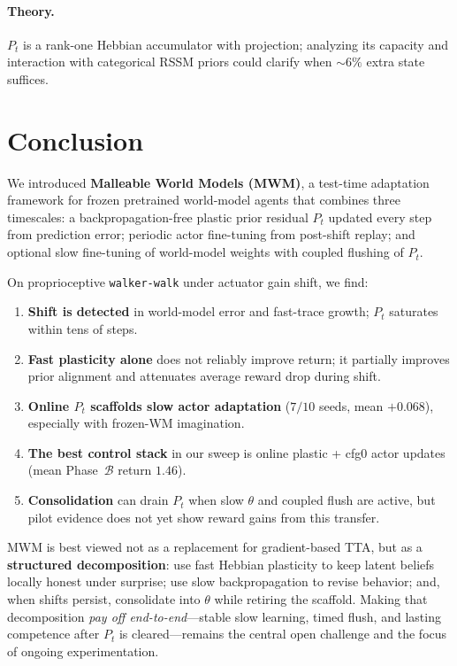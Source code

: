 \paragraph{Theory.}
$P_t$ is a rank-one Hebbian accumulator with projection; analyzing its capacity and interaction with categorical RSSM priors could clarify when ${\sim}6\%$ extra state suffices.

\section{Conclusion}
\label{sec:conclusion}

We introduced \textbf{Malleable World Models (MWM)}, a test-time adaptation framework for frozen pretrained world-model agents that combines three timescales: a backpropagation-free plastic prior residual $P_t$ updated every step from prediction error; periodic actor fine-tuning from post-shift replay; and optional slow fine-tuning of world-model weights with coupled flushing of $P_t$.

On proprioceptive \texttt{walker-walk} under actuator gain shift, we find:
\begin{enumerate}[leftmargin=*, itemsep=2pt]
  \item \textbf{Shift is detected} in world-model error and fast-trace growth; $P_t$ saturates within tens of steps.
  \item \textbf{Fast plasticity alone} does not reliably improve return; it partially improves prior alignment and attenuates average reward drop during shift.
  \item \textbf{Online $P_t$ scaffolds slow actor adaptation} ($7/10$ seeds, mean $+0.068$), especially with frozen-WM imagination.
  \item \textbf{The best control stack} in our sweep is online plastic + cfg0 actor updates (mean Phase~$\mathcal{B}$ return $1.46$).
  \item \textbf{Consolidation} can drain $P_t$ when slow $\theta$ and coupled flush are active, but pilot evidence does not yet show reward gains from this transfer.
\end{enumerate}

MWM is best viewed not as a replacement for gradient-based TTA, but as a \textbf{structured decomposition}: use fast Hebbian plasticity to keep latent beliefs locally honest under surprise; use slow backpropagation to revise behavior; and, when shifts persist, consolidate into $\theta$ while retiring the scaffold.
Making that decomposition \emph{pay off end-to-end}---stable slow learning, timed flush, and lasting competence after $P_t$ is cleared---remains the central open challenge and the focus of ongoing experimentation.
